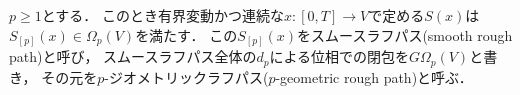 	\begin{screen}
		\begin{dfn}[スムースラフパス]
			$p \geq 1$とする．
			このとき有界変動かつ連続な$x:[0,T] \longrightarrow V$で定める$S(x)$は
			$S_{[p]}(x) \in \Omega_p(V)$を満たす．
			この$S_{[p]}(x)$をスムースラフパス(smooth rough path)と呼び，
			スムースラフパス全体の$d_p$による位相での閉包を$G\Omega_p(V)$と書き，
			その元を$p$-ジオメトリックラフパス($p$-geometric rough path)と呼ぶ．
		\end{dfn}
	\end{screen}